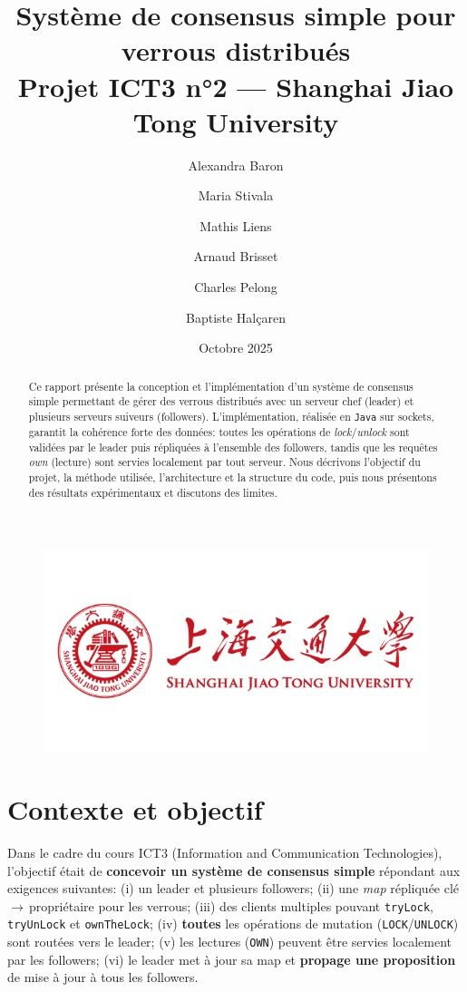 \documentclass[a4paper,11pt]{article}
\title{Système de consensus simple pour verrous distribués\\\large Projet ICT3 n°2 — Shanghai Jiao Tong University}
\author{Alexandra Baron \and Maria Stivala \and Mathis Liens \and Arnaud Brisset \and Charles Pelong\and Baptiste Halçaren}
\date{Octobre 2025}
\begin{document}
\begin{figure}[H]
\centering
\includegraphics[width=0.55\linewidth]{shanghai-jiao-tong-university.png}
\end{figure}

\maketitle

\begin{abstract}
Ce rapport présente la conception et l'implémentation d'un système de consensus simple permettant de gérer des verrous distribués avec un serveur chef (leader) et plusieurs serveurs suiveurs (followers). L'implémentation, réalisée en \texttt{Java} sur sockets, garantit la cohérence forte des données: toutes les opérations de \emph{lock}/\emph{unlock} sont validées par le leader puis répliquées à l'ensemble des followers, tandis que les requêtes \emph{own} (lecture) sont servies localement par tout serveur. Nous décrivons l'objectif du projet, la méthode utilisée, l'architecture et la structure du code, puis nous présentons des résultats expérimentaux et discutons des limites.
\end{abstract}

\section{Contexte et objectif}
Dans le cadre du cours ICT3 (Information and Communication Technologies), l'objectif était de \textbf{concevoir un système de consensus simple} répondant aux exigences suivantes: (i) un leader et plusieurs followers; (ii) une \textit{map} répliquée clé\,$\rightarrow$\,propriétaire pour les verrous; (iii) des clients multiples pouvant \texttt{tryLock}, \texttt{tryUnLock} et \texttt{ownTheLock}; (iv) \textbf{toutes} les opérations de mutation (\texttt{LOCK}/\texttt{UNLOCK}) sont routées vers le leader; (v) les lectures (\texttt{OWN}) peuvent être servies localement par les followers; (vi) le leader met à jour sa map et \textbf{propage une proposition} de mise à jour à tous les followers.
\end{document}
